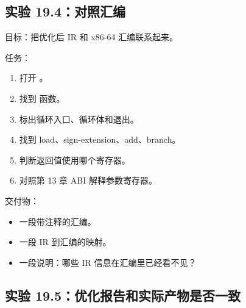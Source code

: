 \subsection{实验 19.4：对照汇编}

\begin{labbox}
目标：把优化后 IR 和 x86-64 汇编联系起来。

任务：

\begin{enumerate}
  \item 打开 。
  \item 找到  函数。
  \item 标出循环入口、循环体和退出。
  \item 找到 load、sign-extension、add、branch。
  \item 判断返回值使用哪个寄存器。
  \item 对照第 13 章 ABI 解释参数寄存器。
\end{enumerate}

交付物：

\begin{itemize}
  \item 一段带注释的汇编。
  \item 一段 IR 到汇编的映射。
  \item 一段说明：哪些 IR 信息在汇编里已经看不见？
\end{itemize}
\end{labbox}

\subsection{实验 19.5：优化报告和实际产物是否一致}

